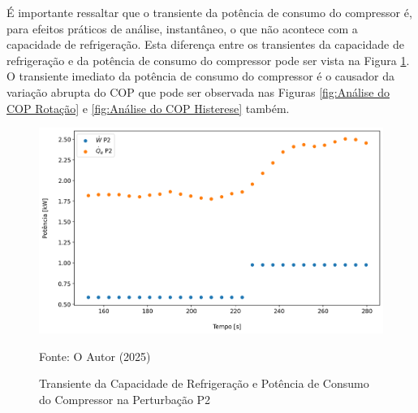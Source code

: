É importante ressaltar que o transiente da potência de consumo do compressor é, para efeitos práticos de análise, instantâneo, o que não acontece com a capacidade de refrigeração. Esta diferença entre os transientes da capacidade de refrigeração e da potência de consumo do compressor pode ser vista na Figura \ref{fig:zoom capapcidade de refrigeração e potência de consumo}. O transiente imediato da potência de consumo do compressor é o causador da variação abrupta do COP que pode ser observada nas Figuras \ref{fig:Análise do COP Rotação} e \ref{fig:Análise do COP Histerese} também. 
\newpage
\begin{figure}[h]
    \centering
    \includegraphics[width=1\linewidth]{FigurasdoTexto/Zoom Capacidade de Refrigeração e Potência de Consumo.png}
    \caption{Transiente da Capacidade de Refrigeração e Potência de Consumo do Compressor na Perturbação P2}
    \label{fig:zoom capapcidade de refrigeração e potência de consumo}
    {\footnotesize Fonte: O Autor (2025)}
\end{figure} 

